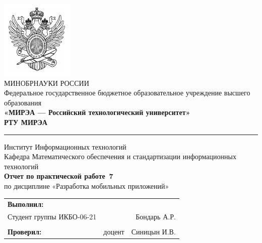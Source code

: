 \begin{titlepage}
	
	\thispagestyle{fancy}
	\renewcommand{\headrulewidth}{0pt}
	\setlength{\headheight}{17.0pt}

	\begin{center}
		\includegraphics[scale=0.5]{./res/logo}\\ %
		МИНОБРНАУКИ РОССИИ\\
		Федеральное государственное бюджетное образовательное
		учреждение высшего образования\\
		\textbf{«МИРЭА --- Российский технологический университет»}\\
		\textbf{\large РТУ МИРЭА}\\
		\bigskip \hrule \smallskip
		Институт Информационных технологий\\
		\vfill
		Кафедра Математического обеспечения и стандартизации
		информационных технологий\\
		\vfill
		\textbf{\large Отчет по практической работе \No\,7}\\
		по дисциплине «Разработка мобильных приложений»\\
		\vfill
		\vfill
		\begin{tabular}{lrr}
			\textbf{Выполнил:} & &\\
			Студент группы ИКБО-06-21 & & Бондарь А.Р. \\\\
			\textbf{Проверил:} &  доцент & Синицын И.В. \\
		\end{tabular}
		\vfill
	\end{center}
\end{titlepage}
\setcounter{page}{2}
\clearpage

